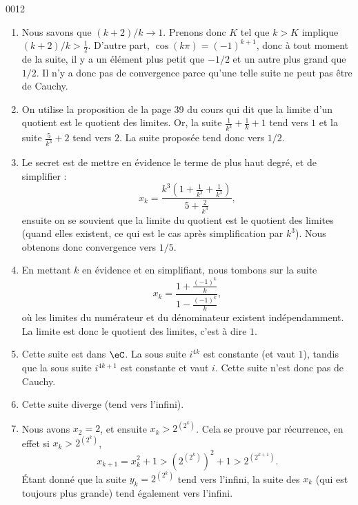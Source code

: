 
\begin{corrige}{0012}

\begin{enumerate}
\item Nous savons que $(k+2)/k\to 1$. Prenons donc $K$ tel que $k>K$ implique $(k+2)/k>\frac{ 1 }{2}$. D'autre part, $\cos(k\pi)=(-1)^{k+1}$, donc à tout moment de la suite, il y a un élément plus petit que $-1/2$ et un autre plus grand que $1/2$. Il n'y a donc pas de convergence parce qu'une telle suite ne peut pas être de Cauchy.

\item On utilise la proposition de la page 39 du cours qui dit que la limite d'un quotient est le quotient des limites. Or, la suite $\frac{1}{ k^3 }+\frac{1}{ k }+1$ tend vers $1$ et la suite $\frac{ 5 }{ k^3 }+2$ tend vers $2$. La suite proposée tend donc vers $1/2$.

\item Le secret est de mettre en évidence le terme de plus haut degré, et de simplifier :
\begin{equation}
	x_k=\frac{ k^3(1+\frac{1}{ k^2 }+\frac{1}{ k^3 }) }{ 5+\frac{ 2 }{ k^3 } },
\end{equation}
ensuite on se souvient que la limite du quotient est le quotient des limites (quand elles existent, ce qui est le cas après simplification par $k^3$). Nous obtenons donc convergence vers $1/5$.

\item 
En mettant $k$ en évidence et en simplifiant, nous tombons sur la suite
\begin{equation}
	x_k=\frac{    1+\frac{ (-1)^k }{ k }   }{  1-\frac{ (-1)^k }{ k }  },
\end{equation}
où les limites du numérateur et du dénominateur existent indépendamment. La limite est donc le quotient des limites, c'est à dire $1$.
\item  Cette suite est dans $\eC$. La sous suite $i^{4k}$ est constante (et vaut $1$), tandis que la sous suite $i^{4k+1}$ est constante et vaut $i$. Cette suite n'est donc pas de Cauchy.
\item Cette suite diverge (tend vers l'infini).
\item Nous avons $x_2=2$, et ensuite $x_k>2^{(2^k)}$. Cela se prouve par récurrence, en effet si $x_k>2^{(2^k)}$,
\begin{equation}
	x_{k+1}=x_k^2+1>\left( 2^{(2^k)} \right)^2+1>2^{(2^{k+1})}.
\end{equation}
Étant donné que la suite $y_k=2^{(2^k)}$ tend vers l'infini, la suite des $x_k$ (qui est toujours plus grande) tend également vers l'infini.


\end{enumerate}
\end{corrige}
